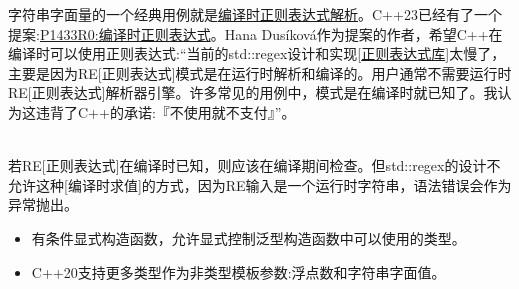 \begin{tcolorbox}[breakable,enhanced jigsaw,colback=mygreen!5!white,colframe=mygreen!75!black,title={编译时的正则表达式}]

字符串字面量的一个经典用例就是\href{https://github.com/hanickadot/compile-time-regular-expressions}{编译时正则表达式解析}。C++23已经有了一个提案:\href{http://www.open-std.org/jtc1/sc22/wg21/docs/papers/2019/p1433r0.pdf}{P1433R0:编译时正则表达式}。Hana Dusíková作为提案的作者，希望C++在编译时可以使用正则表达式:“当前的std::regex设计和实现[\href{https://en.cppreference.com/w/cpp/regex}{正则表达式库}]太慢了，主要是因为RE[正则表达式]模式是在运行时解析和编译的。用户通常不需要运行时RE[正则表达式]解析器引擎。许多常见的用例中，模式是在编译时就已知了。我认为这违背了C++的承诺:『不使用就不支付』”。

\hspace*{\fill} \\ %
若RE[正则表达式]在编译时已知，则应该在编译期间检查。但std::regex的设计不允许这种[编译时求值]的方式，因为RE输入是一个运行时字符串，语法错误会作为异常抛出。

\end{tcolorbox}

\begin{tcolorbox}[breakable,enhanced jigsaw,colback=mygreen!5!white,colframe=mygreen!75!black,title={总结}]
\begin{itemize}
\item 
有条件显式构造函数，允许显式控制泛型构造函数中可以使用的类型。

\item 
C++20支持更多类型作为非类型模板参数:浮点数和字符串字面值。
\end{itemize}
\end{tcolorbox}

\newpage